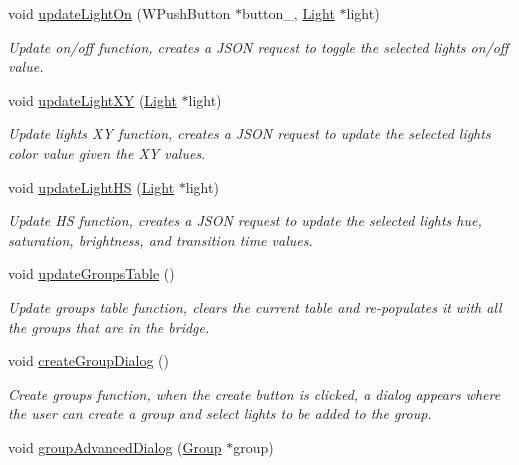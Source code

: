 \begin{DoxyCompactItemize}
void \hyperlink{classLightManagementWidget_abbb93168a42c74301715f6da39ce0040}{update\+Light\+On} (W\+Push\+Button $\ast$button\+\_\+, \hyperlink{classLight}{Light} $\ast$light)
\begin{DoxyCompactList}\small\item\em Update on/off function, creates a J\+S\+ON request to toggle the selected light\textquotesingle{}s on/off value. \end{DoxyCompactList}\item 
void \hyperlink{classLightManagementWidget_a559f5c7680b14415216e00919c01dd3c}{update\+Light\+XY} (\hyperlink{classLight}{Light} $\ast$light)
\begin{DoxyCompactList}\small\item\em Update light\textquotesingle{}s XY function, creates a J\+S\+ON request to update the selected light\textquotesingle{}s color value given the XY values. \end{DoxyCompactList}\item 
void \hyperlink{classLightManagementWidget_a25f87c6906d4f665f17006189161f8ad}{update\+Light\+HS} (\hyperlink{classLight}{Light} $\ast$light)
\begin{DoxyCompactList}\small\item\em Update HS function, creates a J\+S\+ON request to update the selected light\textquotesingle{}s hue, saturation, brightness, and transition time values. \end{DoxyCompactList}\item 
void \hyperlink{classLightManagementWidget_aaf5913f9aa16aaf3d70c929f606851c1}{update\+Groups\+Table} ()
\begin{DoxyCompactList}\small\item\em Update groups table function, clears the current table and re-\/populates it with all the groups that are in the bridge. \end{DoxyCompactList}\item 
void \hyperlink{classLightManagementWidget_afd405081a296906e278bfbea3f200a97}{create\+Group\+Dialog} ()
\begin{DoxyCompactList}\small\item\em Create groups function, when the create button is clicked, a dialog appears where the user can create a group and select lights to be added to the group. \end{DoxyCompactList}\item 
void \hyperlink{classLightManagementWidget_a76c89408eda6d7a22fff2cd308112912}{group\+Advanced\+Dialog} (\hyperlink{classGroup}{Group} $\ast$group)

\end{DoxyCompactItemize}
